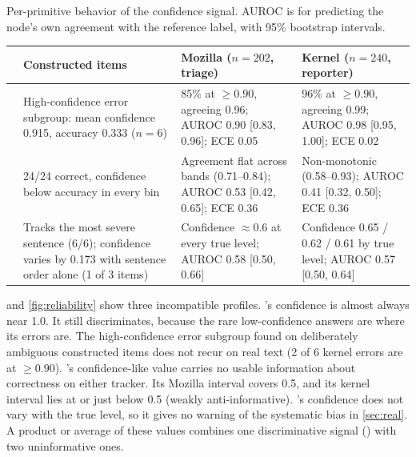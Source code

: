 \begin{widetable}
\centering
\caption{Per-primitive behavior of the confidence signal. AUROC is for
predicting the node's own agreement with the reference label, with 95\% bootstrap intervals.}
\label{tab:char}

\small
\begin{tabularx}{\linewidth}{l Y Y Y}
\toprule
 & Constructed items & Mozilla ($n{=}202$, triage) & Kernel ($n{=}240$, reporter) \\
\midrule
\choice{} & High-confidence error subgroup: mean confidence 0.915, accuracy 0.333 ($n{=}6$)
 & 85\% at $\geq0.90$, agreeing 0.96; AUROC 0.90 [0.83, 0.96]; ECE 0.05
 & 96\% at $\geq0.90$, agreeing 0.99; AUROC 0.98 [0.95, 1.00]; ECE 0.02 \\
\addlinespace
\noul{} & 24/24 correct, confidence below accuracy in every bin
 & Agreement flat across bands (0.71--0.84); AUROC 0.53 [0.42, 0.65]; ECE 0.36
 & Non-monotonic (0.58--0.93); AUROC 0.41 [0.32, 0.50]; ECE 0.36 \\
\addlinespace
\score{} & Tracks the most severe sentence (6/6); confidence varies by 0.173 with sentence order alone (1 of 3 items)
 & Confidence $\approx$0.6 at every true level; AUROC 0.58 [0.50, 0.66]
 & Confidence 0.65 / 0.62 / 0.61 by true level; AUROC 0.57 [0.50, 0.64] \\
\bottomrule
\end{tabularx}

\end{widetable}

 and \cref{fig:reliability} show three incompatible profiles. \choice{}'s confidence
is almost always near 1.0. It still discriminates, because the rare
low-confidence answers are where its errors are. The high-confidence
error subgroup found on deliberately ambiguous constructed items does not
recur on real text (2 of 6 kernel errors are at $\geq 0.90$). \noul{}'s
confidence-like value carries no usable information about correctness on
either tracker. Its Mozilla interval covers 0.5, and its kernel interval
lies at or just below 0.5 (weakly anti-informative). \score{}'s confidence does not vary with the true level,
so it gives no warning of the systematic bias in \cref{sec:real}. A
product or average of these values combines one discriminative
signal (\choice{}) with two uninformative ones.

